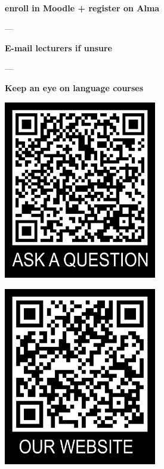 \documentclass[aspectratio=169,hyperref={unicode}]{beamer}
\begin{document}
\begin{frame}
\begin{center}
\textbf{enroll in Moodle + register on Alma}

---

\textbf{E-mail lecturers if unsure}

---

\textbf{Keep an eye on language courses}

\vspace{1em}

\begin{minipage}{0.4\textwidth}
\centering
    \includegraphics[width=0.5\textwidth]{../QRtemplate_5.png}
  \end{minipage}
  \hfill
  \begin{minipage}{0.4\textwidth}
  \centering
    \includegraphics[width=0.5\textwidth]{../QRtemplate_4.png}
  \end{minipage}
\end{center}
\end{frame}
\end{document}
